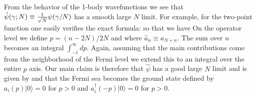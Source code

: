 From the behavior of the 1-body wavefunctions we see that
$\hat \psi(\gamma;N)\equiv {1\over \sqrt{N}}\psi(\gamma/N)$
has a smooth large $N$ limit.
For example, 
for the two-point function one easily verifies
the exact formula:
\eqn{} 
so that we have
\eqn{}
On the operator level we define $p=(n-2N)/2N$ and 
\eqn{}
where $\hat a_n\equiv a_{N+n}$. The sum over $n$ becomes an
integral $\int^{\infty}_{-1}dp$. 
Again, assuming that the main contributions
come from the neighborhood of the Fermi level we extend this to 
an integral over the entire $p$ axis.
Our main claim is therefore that $\hat \psi$ has a good large $N$
limit and is given by 
\eqn{}
and that the Fermi sea becomes the ground state 
defined by 
$a_i(p)|0\rangle=0$ for $p>0$ and $a_i^\dagger(-p)|0\rangle=0$
for $p>0$. 

